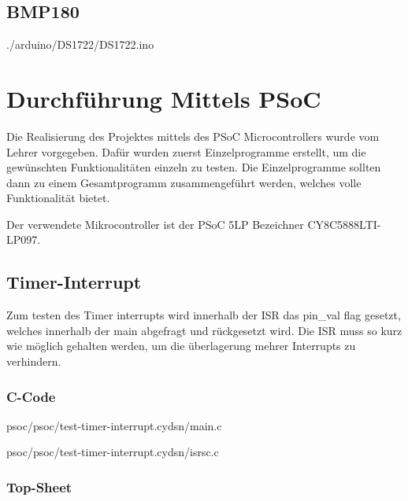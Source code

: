 \documentclass[12pt,a4paper,german]{article}
\begin{document}
\newpage
\subsection{BMP180}


 {./arduino/DS1722/DS1722.ino}

\newpage
\section{Durchführung Mittels PSoC}

	Die Realisierung des Projektes mittels des PSoC Microcontrollers wurde
	vom Lehrer vorgegeben. Dafür wurden zuerst Einzelprogramme erstellt,
	um die gewünschten Funktionalitäten einzeln zu testen. Die
	Einzelprogramme sollten dann zu einem Gesamtprogramm zusammengeführt
	werden, welches volle Funktionalität bietet.

	Der verwendete Mikrocontroller ist der PSoC 5LP Bezeichner 
	CY8C5888LTI-LP097.

\subsection{Timer-Interrupt}

Zum testen des Timer interrupts wird innerhalb der ISR das pin\_val flag gesetzt,
welches innerhalb der main abgefragt und rückgesetzt wird. Die ISR muss so kurz
wie möglich gehalten werden, um die überlagerung mehrer Interrupts zu
verhindern.

\subsubsection{C-Code}


	{psoc/psoc/test-timer-interrupt.cydsn/main.c}

	{psoc/psoc/test-timer-interrupt.cydsn/isrsc.c}


\subsubsection{Top-Sheet}
	 
\end{document}
